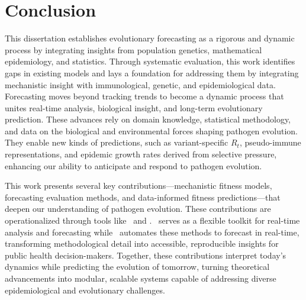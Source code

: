 \chapter{Conclusion}





This dissertation establishes evolutionary forecasting as a rigorous and dynamic process by integrating insights from population genetics, mathematical epidemiology, and statistics. 
Through systematic evaluation, this work identifies gaps in existing models and lays a foundation for addressing them by integrating mechanistic insight with immunological, genetic, and epidemiological data.
Forecasting moves beyond tracking trends to become a dynamic process that unites real-time analysis, biological insight, and long-term evolutionary prediction. These advances rely on domain knowledge, statistical methodology, and data on the biological and environmental forces shaping pathogen evolution. They enable new kinds of predictions, such as variant-specific $R_t$, pseudo-immune representations, and epidemic growth rates derived from selective pressure, enhancing our ability to anticipate and respond to pathogen evolution.

This work presents several key contributions—mechanistic fitness models, forecasting evaluation methods, and data-informed fitness predictions—that deepen our understanding of pathogen evolution.
These contributions are operationalized through tools like \evofr\ and \forecastsNcov.
\evofr\ serves as a flexible toolkit for real-time analysis and forecasting while \forecastsNcov\ automates these methods to forecast in real-time, transforming methodological detail into accessible, reproducible insights for public health decision-makers.
Together, these contributions interpret today’s dynamics while predicting the evolution of tomorrow, turning theoretical advancements into modular, scalable systems capable of addressing diverse epidemiological and evolutionary challenges.

